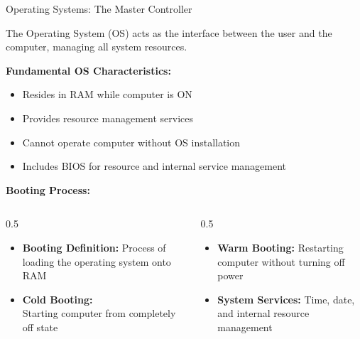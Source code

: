 \documentclass[aspectratio=169]{beamer}
\begin{document}
\begin{frame}{Operating Systems: The Master Controller}
    \begin{definition}
        The Operating System (OS) acts as the interface between the user and the computer, managing all system resources.
    \end{definition}
    
    \vspace{0.3cm}
    \textbf{Fundamental OS Characteristics:}
    \begin{itemize}
        \item Resides in RAM while computer is ON
        \item Provides resource management services
        \item Cannot operate computer without OS installation
        \item Includes BIOS for resource and internal service management
    \end{itemize}
     
    \textbf{Booting Process:}
    \begin{columns}
        \begin{column}{0.5\textwidth}
         \begin{itemize}
           \item \textbf{Booting Definition:} Process of loading the operating system onto RAM
             
            \item \textbf{Cold Booting:}
            \\Starting computer from completely off state
        \end{itemize}
        \end{column}
        \begin{column}{0.5\textwidth}
        \begin{itemize}
           \item \textbf{Warm Booting:} Restarting computer without turning off power 
           \item  \textbf{System Services:} Time, date, and internal resource management
           \end{itemize}
        \end{column}
    \end{columns}
\end{frame}
\end{document}
